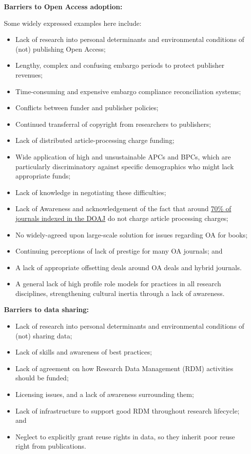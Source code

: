 \textbf{Barriers to Open Access adoption:}

Some widely expressed examples here include:

\begin{itemize}
\item
  Lack of research into personal determinants and environmental
  conditions of (not) publishing Open Access;
\item
  Lengthy, complex and confusing embargo periods to protect publisher
  revenues;
\item
  Time-consuming and expensive embargo compliance reconciliation
  systems;
\item
  Conflicts between funder and publisher policies;
\item
  Continued transferral of copyright from researchers to publishers;
\item
  Lack of distributed article-processing charge funding;
\item
  Wide application of high and unsustainable APCs and BPCs, which are
  particularly discriminatory against specific demographics who might
  lack appropriate funds;
\item
  Lack of knowledge in negotiating these difficulties;
\item
  Lack of Awareness and acknowledgement of the fact that around
  \href{https://sustainingknowledgecommons.org/2018/02/06/doaj-apc-information-as-of-jan-31-2018/}{70\%
  of journals indexed in the DOAJ} do not charge article processing
  charges;
\item
  No widely-agreed upon large-scale solution for issues regarding OA for
  books;
\item
  Continuing perceptions of lack of prestige for many OA journals; and
\item
  A lack of appropriate offsetting deals around OA deals and hybrid
  journals.
\item
  A general lack of high profile role models for practices in all
  research disciplines, strengthening cultural inertia through a lack of
  awareness.
\end{itemize}

\textbf{Barriers to data sharing:}

\begin{itemize}
\item
  Lack of research into personal determinants and environmental
  conditions of (not) sharing data;
\item
  Lack of skills and awareness of best practices;
\item
  Lack of agreement on how Research Data Management (RDM) activities
  should be funded;
\item
  Licensing issues, and a lack of awareness surrounding them;
\item
  Lack of infrastructure to support good RDM throughout research
  lifecycle; and
\item
  Neglect to explicitly grant reuse rights in data, so they inherit poor
  reuse right from publications.
\end{itemize}

